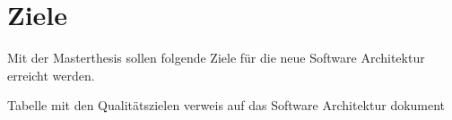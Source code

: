 \chapter{Ziele}

Mit der Masterthesis sollen folgende Ziele für die neue Software Architektur erreicht werden.

Tabelle mit den Qualitätszielen
verweis auf das Software Architektur dokument